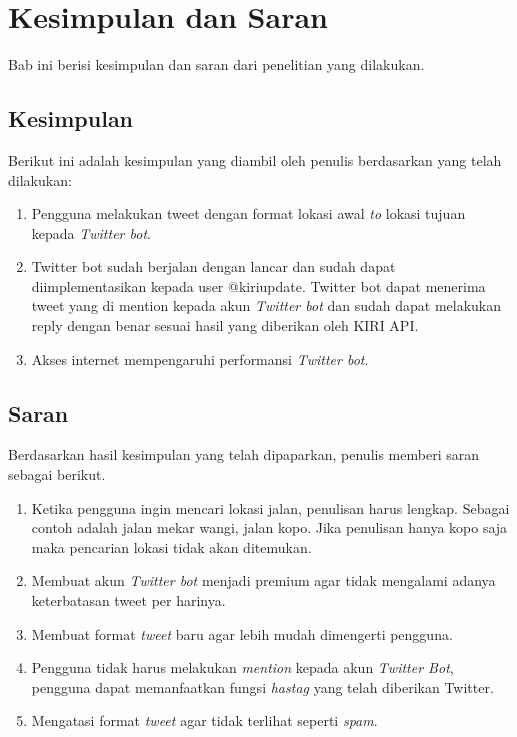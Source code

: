 \chapter{Kesimpulan dan Saran}
\label{chap:kesimpulan dan saran}

Bab ini berisi kesimpulan dan saran dari penelitian yang dilakukan.

\section{Kesimpulan}
Berikut ini adalah kesimpulan yang diambil oleh penulis berdasarkan yang telah dilakukan:

\begin{enumerate}
	\item Pengguna melakukan tweet dengan format lokasi awal \textit{to} lokasi tujuan kepada \textit{Twitter bot}.
	\item Twitter bot sudah berjalan dengan lancar dan sudah dapat diimplementasikan kepada user @kiriupdate. Twitter bot dapat menerima tweet yang di mention kepada akun \textit{Twitter bot} dan sudah dapat melakukan reply dengan benar sesuai hasil yang diberikan oleh KIRI API.
	\item Akses internet mempengaruhi performansi \textit{Twitter bot}.
\end{enumerate}

\section{Saran}
Berdasarkan hasil kesimpulan yang telah dipaparkan, penulis memberi saran sebagai berikut.

\begin{enumerate}
	\item Ketika pengguna ingin mencari lokasi jalan, penulisan harus lengkap. Sebagai contoh adalah jalan mekar wangi, jalan kopo. Jika penulisan hanya kopo saja maka pencarian lokasi tidak akan ditemukan.
	\item Membuat akun \textit{Twitter bot} menjadi premium agar tidak mengalami adanya keterbatasan tweet per harinya.
	\item Membuat format \textit{tweet} baru agar lebih mudah dimengerti pengguna.
	\item Pengguna tidak harus melakukan \textit{mention} kepada akun \textit{Twitter Bot}, pengguna dapat memanfaatkan fungsi \textit{hastag} yang telah diberikan Twitter.
	\item Mengatasi format \textit{tweet} agar tidak terlihat seperti \textit{spam}.
\end{enumerate}